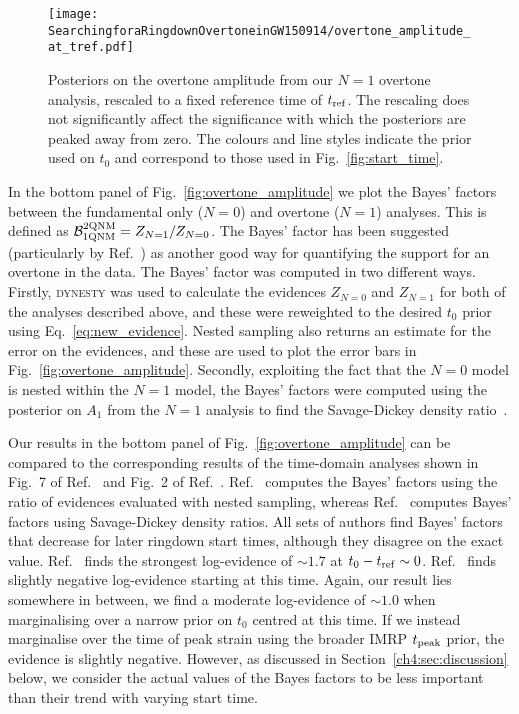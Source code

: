 \begin{figure}[t]
    \centering
    \texttt{[image: SearchingforaRingdownOvertoneinGW150914/overtone\_amplitude\_at\_tref.pdf]}
    \caption[Posteriors on the GW150914 overtone amplitude, as in Fig.~\ref{fig:overtone_amplitude}, rescaled to a fixed reference time]{ 
    Posteriors on the overtone amplitude from our $N=1$ overtone analysis, rescaled to a fixed reference time of $t_{\rm ref}$.
    The rescaling does not significantly affect the significance with which the posteriors are peaked away from zero.
    The colours and line styles indicate the prior used on $t_0$ and correspond to those used in Fig.~\ref{fig:start_time}.
    }
    \label{fig:amp_at_tref}
\end{figure}

In the bottom panel of Fig.~\ref{fig:overtone_amplitude} we plot the Bayes' factors between the fundamental only ($N=0$) and overtone ($N=1$) analyses.
This is defined as $\mathcal{B}_{\rm 1QNM}^{\rm 2QNM}=Z_{N=1}/Z_{N=0}$.
The Bayes' factor has been suggested (particularly by Ref.~\cite{Cotesta:2022pci}) as another good way for quantifying the support for an overtone in the data.
The Bayes' factor was computed in two different ways.
Firstly, \textsc{dynesty} was used to calculate the evidences $Z_{N=0}$ and $Z_{N=1}$ for both of the analyses described above, and these were reweighted to the desired $t_0$ prior using Eq.~\ref{eq:new_evidence}. 
Nested sampling also returns an estimate for the error on the evidences, and these are used to plot the error bars in Fig.~\ref{fig:overtone_amplitude}.
Secondly, exploiting the fact that the $N=0$ model is nested within the $N=1$ model, the Bayes' factors were computed using the posterior on $A_1$ from the $N=1$ analysis to find the Savage-Dickey density ratio~\cite{10.2307/2958475}. 

Our results in the bottom panel of Fig.~\ref{fig:overtone_amplitude} can be compared to the corresponding results of the time-domain analyses shown in Fig.~7 of Ref.~\cite{Isi:2022mhy} and Fig.~2 of Ref.~\cite{Cotesta:2022pci}.
Ref.~\cite{Cotesta:2022pci} computes the Bayes' factors using the ratio of evidences evaluated with nested sampling, whereas Ref.~\cite{Isi:2022mhy} computes Bayes' factors using Savage-Dickey density ratios.
All sets of authors find Bayes' factors that decrease for later ringdown start times, although they disagree on the exact value.
Ref.~\cite{Isi:2022mhy} finds the strongest log-evidence of $\sim 1.7$ at $t_0-t_{\rm ref} \sim 0$.
Ref.~\cite{Cotesta:2022pci} finds slightly negative log-evidence starting at this time.
Again, our result lies somewhere in between, we find a moderate log-evidence of $\sim 1.0$ when marginalising over a narrow prior on $t_0$ centred at this time.
If we instead marginalise over the time of peak strain using the broader IMRP $t_{\rm peak}$ prior, the evidence is slightly negative.
However, as discussed in Section~\ref{ch4:sec:discussion} below, we consider the actual values of the Bayes factors to be less important than their trend with varying start time.


